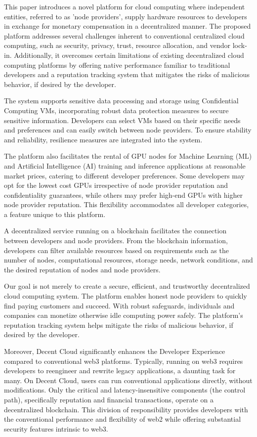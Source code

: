 This paper introduces a novel platform for cloud computing where independent entities, referred to as 'node providers', supply hardware resources to developers in exchange for monetary compensation in a decentralized manner. The proposed platform addresses several challenges inherent to conventional centralized cloud computing, such as security, privacy, trust, resource allocation, and vendor lock-in. Additionally, it overcomes certain limitations of existing decentralized cloud computing platforms by offering native performance familiar to traditional developers and a reputation tracking system that mitigates the risks of malicious behavior, if desired by the developer.

The system supports sensitive data processing and storage using Confidential Computing VMs, incorporating robust data protection measures to secure sensitive information. Developers can select VMs based on their specific needs and preferences and can easily switch between node providers. To ensure stability and reliability, resilience measures are integrated into the system.

The platform also facilitates the rental of GPU nodes for Machine Learning (ML) and Artificial Intelligence (AI) training and inference applications at reasonable market prices, catering to different developer preferences. Some developers may opt for the lowest cost GPUs irrespective of node provider reputation and confidentiality guarantees, while others may prefer high-end GPUs with higher node provider reputation. This flexibility accommodates all developer categories, a feature unique to this platform.

A decentralized service running on a blockchain facilitates the connection between developers and node providers. From the blockchain information, developers can filter available resources based on requirements such as the number of nodes, computational resources, storage needs, network conditions, and the desired reputation of nodes and node providers.

Our goal is not merely to create a secure, efficient, and trustworthy decentralized cloud computing system. The platform enables honest node providers to quickly find paying customers and succeed. With robust safeguards, individuals and companies can monetize otherwise idle computing power safely. The platform's reputation tracking system helps mitigate the risks of malicious behavior, if desired by the developer.

Moreover, Decent Cloud significantly enhances the Developer Experience compared to conventional web3 platforms. Typically, running on web3 requires developers to reengineer and rewrite legacy applications, a daunting task for many. On Decent Cloud, users can run conventional applications directly, without modifications. Only the critical and latency-insensitive components (the control path), specifically reputation and financial transactions, operate on a decentralized blockchain. This division of responsibility provides developers with the conventional performance and flexibility of web2 while offering substantial security features intrinsic to web3.
